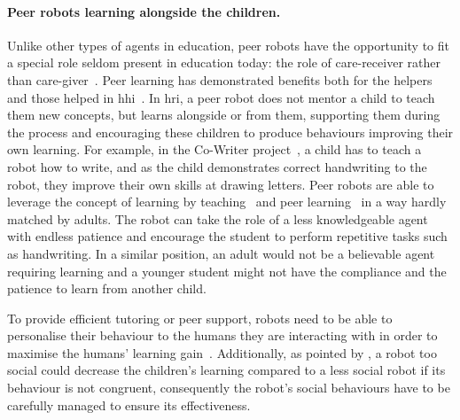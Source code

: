 	\paragraph{Peer robots learning alongside the children.}
	Unlike other types of agents in education, peer robots have the opportunity to fit a special role seldom present in education today: the role of care-receiver rather than care-giver~\citep{tanaka2012children}. Peer learning has demonstrated benefits both for the helpers and those helped in \gls{hhi}~\citep{topping2005trends}. In \gls{hri}, a peer robot does not mentor a child to teach them new concepts, but learns alongside or from them, supporting them during the process and encouraging these children to produce behaviours improving their own learning. For example, in the Co-Writer project~\citep{hood2015children}, a child has to teach a robot how to write, and as the child demonstrates correct handwriting to the robot, they improve their own skills at drawing letters. Peer robots are able to leverage the concept of learning by teaching~\citep{frager1970learning} and peer learning~\citep{topping2005trends} in a way hardly matched by adults. The robot can take the role of a less knowledgeable agent with endless patience and encourage the student to perform repetitive tasks such as handwriting. In a similar position, an adult would not be a believable agent requiring learning and a younger student might not have the compliance and the patience to learn from another child.
	
	To provide efficient tutoring or peer support, robots need to be able to personalise their behaviour to the humans they are interacting with in order to maximise the humans' learning gain~\citep{leyzberg2014personalizing}. Additionally, as pointed by \citet{kennedy2015robot}, a robot too social could decrease the children's learning compared to a less social robot if its behaviour is not congruent, consequently the robot's social behaviours have to be carefully managed to ensure its effectiveness. 
	

